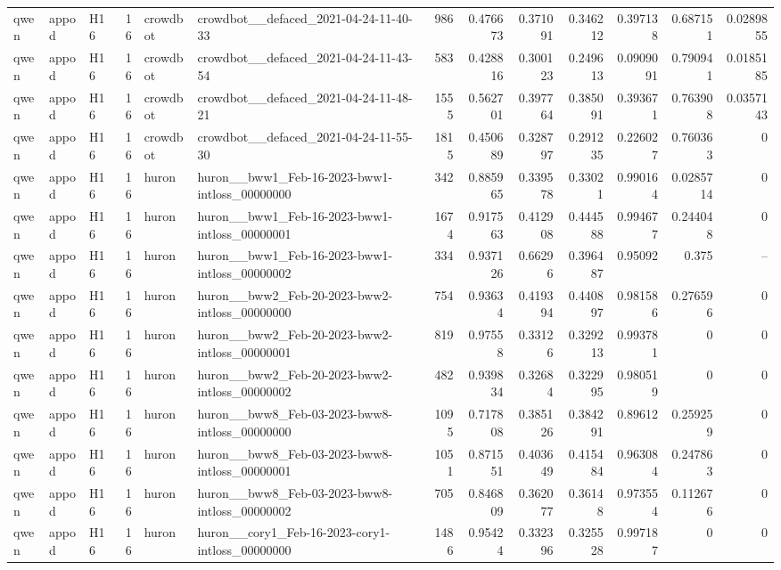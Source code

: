 \begin{longtable}{lllrllrrrrrrr}
qwen & appod & H16 & 16 & crowdbot & crowdbot\_\_defaced\_2021-04-24-11-40-33 & 986 & 0.476673 & 0.371091 & 0.346212 & 0.397138 & 0.687151 & 0.0289855 \\
qwen & appod & H16 & 16 & crowdbot & crowdbot\_\_defaced\_2021-04-24-11-43-54 & 583 & 0.428816 & 0.300123 & 0.249613 & 0.0909091 & 0.790941 & 0.0185185 \\
qwen & appod & H16 & 16 & crowdbot & crowdbot\_\_defaced\_2021-04-24-11-48-21 & 1555 & 0.562701 & 0.397764 & 0.385091 & 0.393671 & 0.763908 & 0.0357143 \\
qwen & appod & H16 & 16 & crowdbot & crowdbot\_\_defaced\_2021-04-24-11-55-30 & 1815 & 0.450689 & 0.328797 & 0.291235 & 0.226027 & 0.760363 & 0 \\
qwen & appod & H16 & 16 & huron & huron\_\_bww1\_Feb-16-2023-bww1-intloss\_00000000 & 342 & 0.885965 & 0.339578 & 0.33021 & 0.990164 & 0.0285714 & 0 \\
qwen & appod & H16 & 16 & huron & huron\_\_bww1\_Feb-16-2023-bww1-intloss\_00000001 & 1674 & 0.917563 & 0.412908 & 0.444588 & 0.994677 & 0.244048 & 0 \\
qwen & appod & H16 & 16 & huron & huron\_\_bww1\_Feb-16-2023-bww1-intloss\_00000002 & 334 & 0.937126 & 0.66296 & 0.396487 & 0.95092 & 0.375 & -- \\
qwen & appod & H16 & 16 & huron & huron\_\_bww2\_Feb-20-2023-bww2-intloss\_00000000 & 754 & 0.93634 & 0.419394 & 0.440897 & 0.981586 & 0.276596 & 0 \\
qwen & appod & H16 & 16 & huron & huron\_\_bww2\_Feb-20-2023-bww2-intloss\_00000001 & 819 & 0.97558 & 0.33126 & 0.329213 & 0.993781 & 0 & 0 \\
qwen & appod & H16 & 16 & huron & huron\_\_bww2\_Feb-20-2023-bww2-intloss\_00000002 & 482 & 0.939834 & 0.32684 & 0.322995 & 0.980519 & 0 & 0 \\
qwen & appod & H16 & 16 & huron & huron\_\_bww8\_Feb-03-2023-bww8-intloss\_00000000 & 1095 & 0.717808 & 0.385126 & 0.384291 & 0.89612 & 0.259259 & 0 \\
qwen & appod & H16 & 16 & huron & huron\_\_bww8\_Feb-03-2023-bww8-intloss\_00000001 & 1051 & 0.871551 & 0.403649 & 0.415484 & 0.963084 & 0.247863 & 0 \\
qwen & appod & H16 & 16 & huron & huron\_\_bww8\_Feb-03-2023-bww8-intloss\_00000002 & 705 & 0.846809 & 0.362077 & 0.36148 & 0.973554 & 0.112676 & 0 \\
qwen & appod & H16 & 16 & huron & huron\_\_cory1\_Feb-16-2023-cory1-intloss\_00000000 & 1486 & 0.95424 & 0.332396 & 0.325528 & 0.997187 & 0 & 0 \\

\end{longtable}
